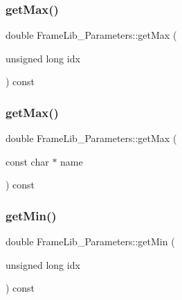 \subsubsection{\texorpdfstring{get\+Max()}{getMax()}\hspace{0.1cm}{\footnotesize\ttfamily [1/2]}}
{\footnotesize\ttfamily double Frame\+Lib\+\_\+\+Parameters\+::get\+Max (\begin{DoxyParamCaption}\item[{unsigned long}]{idx }\end{DoxyParamCaption}) const\hspace{0.3cm}{\ttfamily [inline]}}

\mbox{\label{class_frame_lib___parameters_a9b1b814d8df6fed63adb0854383df279}} 
\subsubsection{\texorpdfstring{get\+Max()}{getMax()}\hspace{0.1cm}{\footnotesize\ttfamily [2/2]}}
{\footnotesize\ttfamily double Frame\+Lib\+\_\+\+Parameters\+::get\+Max (\begin{DoxyParamCaption}\item[{const char $\ast$}]{name }\end{DoxyParamCaption}) const\hspace{0.3cm}{\ttfamily [inline]}}

\mbox{\label{class_frame_lib___parameters_af73a52dd8beadde0c65159fd2d8d35ce}} 
\subsubsection{\texorpdfstring{get\+Min()}{getMin()}\hspace{0.1cm}{\footnotesize\ttfamily [1/2]}}
{\footnotesize\ttfamily double Frame\+Lib\+\_\+\+Parameters\+::get\+Min (\begin{DoxyParamCaption}\item[{unsigned long}]{idx }\end{DoxyParamCaption}) const\hspace{0.3cm}{\ttfamily [inline]}}

